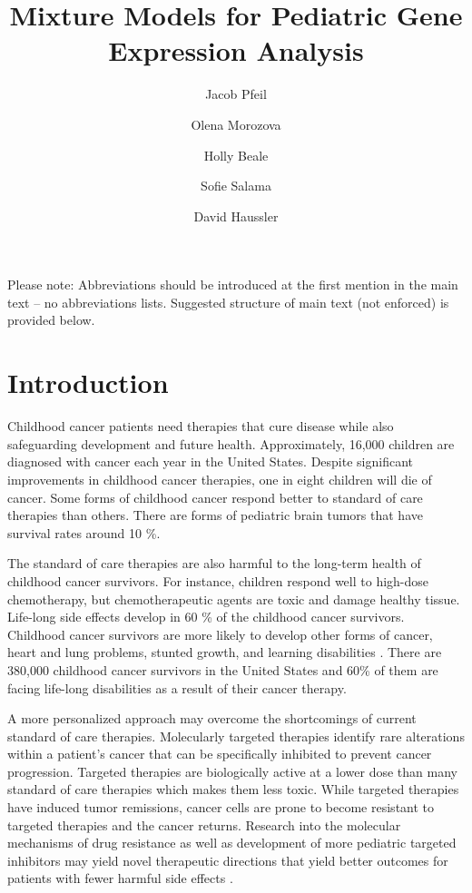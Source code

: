 \documentclass[fleqn,10pt]{wlscirep}
\title{Mixture Models for Pediatric Gene Expression Analysis}
\author[1,*]{Jacob Pfeil}
\author[1]{Olena Morozova}
\author[1]{Holly Beale}
\author[1]{Sofie Salama}
\author[1]{David Haussler}
\affil[1]{University of California, Santa Cruz, Biomolecular Engineering, Santa Cruz, 95064, United States}
\affil[*]{jpfeil@ucsc.edu}
\newcommand{\textapprox}{\raisebox{0.5ex}{\texttildelow}}
\begin{document}
\flushbottom
\maketitle
%
%
\thispagestyle{empty}

\noindent Please note: Abbreviations should be introduced at the first mention in the main text – no abbreviations lists. Suggested structure of main text (not enforced) is provided below.

\section*{Introduction}


Childhood cancer patients need therapies that cure disease while also safeguarding development and future health. Approximately, 16,000 children are diagnosed with cancer each year in the United States. Despite significant improvements in childhood cancer therapies, one in eight children will die of cancer. Some forms of childhood cancer respond better to standard of care therapies than others. There are forms of pediatric brain tumors that have survival rates around \textapprox 10 \%. 

The standard of care therapies are also harmful to the long-term health of childhood cancer survivors. For instance, children respond well to high-dose chemotherapy, but chemotherapeutic agents are toxic and damage healthy tissue. Life-long side effects develop in \textapprox 60 \% of the childhood cancer survivors. Childhood cancer survivors are more likely to develop other forms of cancer, heart and lung problems, stunted growth, and learning disabilities \cite{cancer.org:longTermEffects,kopp2012late,AmericanCancerSociety:ChildCancer}. There are \textapprox 380,000 childhood cancer survivors in the United States and 60\% of them are facing life-long disabilities as a result of their cancer therapy.

A more personalized approach may overcome the shortcomings of current standard of care therapies. Molecularly targeted therapies identify rare alterations within a patient's cancer that can be specifically inhibited to prevent cancer progression. Targeted therapies are biologically active at a lower dose than many standard of care therapies which makes them less toxic. While targeted therapies have induced tumor remissions, cancer cells are prone to become resistant to targeted therapies and the cancer returns. Research into the molecular mechanisms of drug resistance as well as development of more pediatric targeted inhibitors may yield novel therapeutic directions that yield better outcomes for patients with fewer harmful side effects \cite{norris2012challenges}. 
\end{document}
